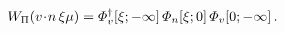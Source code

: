 \begin{equation}
W_{\scriptstyle\Pi} ({v \!\cdot\! n} \, \xi\mu )
=
{\mit\Phi}^\dagger_v [ \xi ; - \infty ]\,
{\mit\Phi}_n [ \xi ; 0 ]\, {\mit\Phi}_v [ 0 ; - \infty ]
\, .
\label{W-DIS}
\end{equation}

